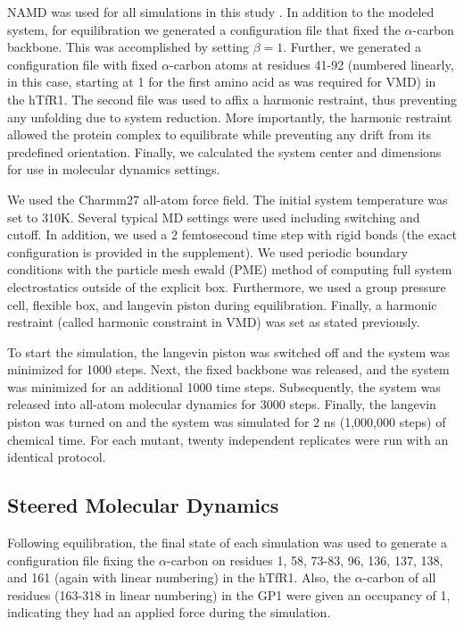 \documentclass[12pt]{article} %
\providecommand{\DIFaddbegin}{} %
\providecommand{\DIFaddend}{} %
\providecommand{\DIFdelbegin}{} %
\providecommand{\DIFdelend}{} %
\begin{document}
NAMD was used for all simulations in this study \DIFdelbegin %
\DIFdelend \DIFaddbegin \citep{Phillips2005}\DIFaddend . In addition to the modeled system, for equilibration we generated a configuration file that fixed the $\alpha$-carbon backbone. This was accomplished by setting $\beta = 1$. Further, we generated a configuration file with fixed $\alpha$-carbon atoms at residues 41-92 (numbered linearly, in this case, starting at 1 for the first amino acid as was required for VMD) in the hTfR1. The second file was used to affix a harmonic restraint, thus preventing any unfolding due to system reduction. More importantly, the harmonic restraint allowed the protein complex to equilibrate while preventing any drift from its predefined orientation. Finally, we calculated the system center and dimensions for use in molecular dynamics settings.

We used the Charmm27 \DIFdelbegin %
\DIFdelend \DIFaddbegin \citep{Brooks1983} \DIFaddend all-atom force field. The initial system temperature was set to 310K. Several typical MD settings were used including switching and cutoff. In addition, we used a 2 femtosecond time step with rigid bonds (the exact configuration is provided in the supplement). We used periodic boundary conditions with the particle mesh ewald (PME) method of computing full system electrostatics outside of the explicit box. Furthermore, we used a group pressure cell, flexible box, and langevin piston during equilibration. Finally, a harmonic restraint (called harmonic constraint in VMD) was set as stated previously.

To start the simulation, the langevin piston was switched off and the system was minimized for 1000 steps. Next, the fixed backbone was released, and the system was minimized for an additional 1000 time steps. Subsequently, the system was released into all-atom molecular dynamics for 3000 steps. Finally, the langevin piston was turned on and the system was simulated for 2 ns (1,000,000 steps) of chemical time. For each mutant, twenty independent replicates were run with an identical protocol.

\subsection{Steered Molecular Dynamics}

Following equilibration, the final state of each simulation was used to generate a configuration file fixing the $\alpha$-carbon on residues 1, 58, 73-83, 96, 136, 137, 138, and 161 (again with linear numbering) in the hTfR1. Also, the $\alpha$-carbon of all residues (163-318 in linear numbering) in the GP1 were given an occupancy of 1, indicating they had an applied force during the simulation. 
\end{document}
